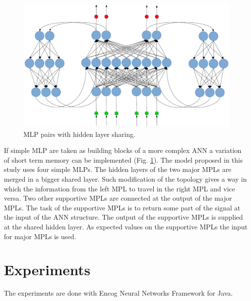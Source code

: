 \documentclass{llncs}
\begin{document}
\begin{figure}
  \includegraphics[width=1.0\linewidth]{fig01}
  \caption{MLP pairs with hidden layer sharing.}
  \label{fig01}
\end{figure}
\FloatBarrier

If simple MLP are taken as building blocks of a more complex ANN a variation of short term memory can be implemented (Fig. \ref{fig01}). The model proposed in this study uses four simple MLPs. The hidden layers of the two major MPLs are merged in a bigger shared layer. Such modification of the topology gives a way in which the information from the left MPL to travel in the right MPL and vice versa. Two other supportive MPLs are connected at the output of the major MPLs. The task of the supportive MPLs is to return some part of the signal at the input of the ANN structure. The output of the supportive MPLs is supplied at the shared hidden layer. As expected values on the supportive MPLs the input for major MPLs is used. 

\section{Experiments} \label{Experiments}

The experiments are done with Encog Neural Networks Framework for Java.
\end{document}
